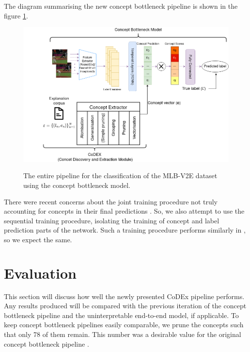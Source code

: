 The diagram summarising the new concept bottleneck pipeline is shown in the figure \ref{full-architecture-diagram}.

\begin{figure}[h]
\caption{The entire pipeline for the classification of the MLB-V2E dataset using the concept bottleneck model.} 
\centering
\includegraphics[width=\textwidth]{concept-bottleneck-pipeline/new-concept-bottleneck-pipeline.png}
\label{full-architecture-diagram}
\end{figure}

There were recent concerns about the joint training procedure not truly accounting for concepts in their final predictions \cite{RefWorks:RefID:68-margeloiu2021concept}. 
So, we also attempt to use the sequential training procedure, isolating the training of concept and label prediction parts of the network.
Such a training procedure performs similarly in \cite{RefWorks:RefID:35-koh2020concept}, so we expect the same.

\section{Evaluation}

This section will discuss how well the newly presented CoDEx pipeline performs.
Any results produced will be compared with the previous iteration of the concept bottleneck pipeline and the uninterpretable end-to-end model, if applicable.
To keep concept bottleneck pipelines easily comparable, we prune the concepts such that only 78 of them remain.
This number was a desirable value for the original concept bottleneck pipeline \cite{RefWorks:RefID:16-2021automatic}.

